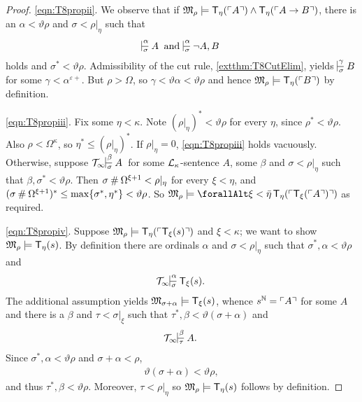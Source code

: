 \documentclass[UKenglish,cleveref,DIV=12]{scrartcl}
\let\forall\forallAlt
\theoremstyle{definition}
\theoremstyle{definition}
\begin{document}
\begin{proof}

\ref{eqn:T8propii}. We observe that if $\mathfrak M_\rho\models
\mathsf{T}_\eta(\ulcorner{A}\urcorner)\land\mathsf{T}_\eta(\ulcorner{A\rightarrow B}\urcorner)$, there is an
$\alpha<\vartheta\rho$ and $\sigma<\rho|_\eta$ such that
\begin{align*}
 \prov{\alpha}\sigma{A}\text{ and }\prov{\alpha}\sigma{\lnot A,B}
\end{align*}
holds and $\sigma^*<\vartheta\rho$. Admissibility of the cut rule, \cref{extthm:T8CutElim}, yields
$\prov{\gamma}\sigma{B}$ for some $\gamma<\alpha^{\varepsilon+}$. But $\rho>\Omega$, so $\gamma<\vartheta\alpha<\vartheta\rho$ and hence $\mathfrak M_\rho\models \mathsf{T}_\eta(\ulcorner{B}\urcorner)$ by definition.

\ref{eqn:T8propiii}. Fix some $\eta<\kappa$. Note $(\rho|_\eta)^*<\vartheta\rho$ for every $\eta$, since $\rho^*<\vartheta\rho$. Also $\rho<\Omega^\kappa$, so $\eta^*\le(\rho|_\eta)^*$. If $\rho|_\eta=0$,
\ref{eqn:T8propiii} holds vacuously. Otherwise, suppose $\Tinfty\prov\beta\sigma A$ for some $\mathcal{L}_\kappa$-sentence $A$, some $\beta$ and $\sigma<\rho|_\eta$ such that $\beta,\sigma^*<\vartheta\rho$. Then $\sigma\mathbin{\#}\Omega^{\xi+1}<\rho|_\eta$ for every $\xi<\eta$, and $(\sigma\mathbin{\#}\Omega^{\xi+1})^*\le\max\{\sigma^*,\eta^*\}<\vartheta\rho$. So $\mathfrak M_\rho\models\forall\xi<\bar\eta\,\T_\eta(\gn{\T_\xi(\gn A)})$ as required.

\ref{eqn:T8propiv}. Suppose $ \mathfrak M_\rho\models \mathsf{T}_\eta(\ulcorner{\mathsf{T}_\xi(s)}\urcorner)$ and $\xi<\kappa$; we want to show $\mathfrak M_\rho\models \mathsf{T}_\eta(s)$. By definition there are ordinals $\alpha$ and $\sigma<\rho|_\eta$ such that $\sigma^*,\alpha<\vartheta\rho$ and
\begin{align*}%
 \Tinfty\prov{\alpha}{\sigma}{\T_\xi(s).}
\end{align*}
The additional assumption yields $\mathfrak{M}_{\sigma+\alpha}\models \mathsf{T}_\xi(s)$, whence $s^\mathbb N=\ulcorner{A}\urcorner$ for some $A$ and there is a $\beta$ and $\tau<\sigma|_\xi$ such that $\tau^*,\beta<\vartheta(\sigma+\alpha)$ and
\begin{align*}
  \Tinfty\prov\beta\tau {A.}
\end{align*}
Since $\sigma^*,\alpha<\vartheta\rho$ and $\sigma+\alpha<\rho$,
\begin{align*}
  \vartheta(\sigma+\alpha)< \vartheta\rho,
\end{align*}
and thus $\tau^*,\beta<\vartheta\rho$. Moreover, $\tau<\rho|_\eta$ so
$\mathfrak M_\rho\models \mathsf{T}_\eta(s)$ follows by definition.


\end{proof}
\end{document}
